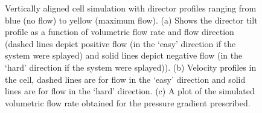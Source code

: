 \begin{figure}
\begin{center}
\end{center}
\caption[Simulated tilt, velocity and pressure gradients for a vertically aligned cell]{\label{fig:diode_homo}Vertically aligned cell simulation with director profiles ranging from blue (no flow) to yellow (maximum flow). (a) Shows the director tilt profile as a function of volumetric flow rate and flow direction (dashed lines depict positive flow (in the `easy' direction if the system were splayed) and solid lines depict negative flow (in the `hard' direction if the system were splayed)). (b) Velocity profiles in the cell, dashed lines are for flow in the `easy' direction and solid lines are for flow in the `hard' direction. (c) A plot of the simulated volumetric flow rate obtained for the pressure gradient prescribed.}
\end{figure}

